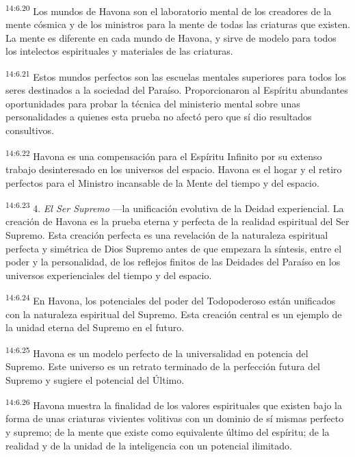 \par
\textsuperscript{14:6.20} Los mundos de Havona son el laboratorio mental de los creadores de la mente cósmica y de los ministros para la mente de todas las criaturas que existen. La mente es diferente en cada mundo de Havona, y sirve de modelo para todos los intelectos espirituales y materiales de las criaturas.

\par
\textsuperscript{14:6.21} Estos mundos perfectos son las escuelas mentales superiores para todos los seres destinados a la sociedad del Paraíso. Proporcionaron al Espíritu abundantes oportunidades para probar la técnica del ministerio mental sobre unas personalidades a quienes esta prueba no afectó pero que sí dio resultados consultivos.

\par
\textsuperscript{14:6.22} Havona es una compensación para el Espíritu Infinito por su extenso trabajo desinteresado en los universos del espacio. Havona es el hogar y el retiro perfectos para el Ministro incansable de la Mente del tiempo y del espacio.

\par
\textsuperscript{14:6.23} 4. \textit{El Ser Supremo} ---la unificación evolutiva de la Deidad experiencial. La creación de Havona es la prueba eterna y perfecta de la realidad espiritual del Ser Supremo. Esta creación perfecta es una revelación de la naturaleza espiritual perfecta y simétrica de Dios Supremo antes de que empezara la síntesis, entre el poder y la personalidad, de los reflejos finitos de las Deidades del Paraíso en los universos experienciales del tiempo y del espacio.

\par
\textsuperscript{14:6.24} En Havona, los potenciales del poder del Todopoderoso están unificados con la naturaleza espiritual del Supremo. Esta creación central es un ejemplo de la unidad eterna del Supremo en el futuro.

\par
\textsuperscript{14:6.25} Havona es un modelo perfecto de la universalidad en potencia del Supremo. Este universo es un retrato terminado de la perfección futura del Supremo y sugiere el potencial del Último.

\par
\textsuperscript{14:6.26} Havona muestra la finalidad de los valores espirituales que existen bajo la forma de unas criaturas vivientes volitivas con un dominio de sí mismas perfecto y supremo; de la mente que existe como equivalente último del espíritu; de la realidad y de la unidad de la inteligencia con un potencial ilimitado.

